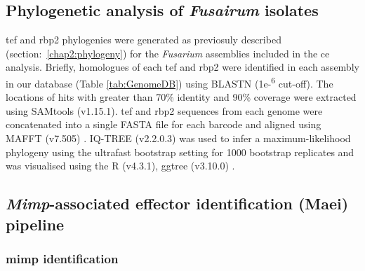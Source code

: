 \bigskip

\bigskip

\newpage

\subsection{Phylogenetic analysis of \textit{Fusairum} isolates}

\Ac{tef} and \ac{rbp2} phylogenies were generated as previosuly described (section:~\ref{chap2:phylogeny}) for the \textit{Fusarium} assemblies included in the \ac{ce} analysis. Briefly, homologues of each \ac{tef} and \ac{rbp2} were identified in each assembly in our database  (Table \ref{tab:GenomeDB}) using BLASTN (1e-\textsuperscript{6} cut-off). The locations of hits with greater than 70\% identity and 90\% coverage were extracted using SAMtools (v1.15.1). \Ac{tef} and \ac{rbp2} sequences from each genome were concatenated into a single FASTA file for each barcode and aligned using MAFFT (v7.505) \parencite{Katoh2019}. IQ-TREE (v2.2.0.3) \parencite{Nguyen2015} was used to infer a maximum-likelihood phylogeny using the ultrafast bootstrap setting for 1000 bootstrap replicates and was visualised using the R \parencite{R} (v4.3.1), ggtree (v3.10.0) \parencite{ggtree}.





\subsection{\textit{Mimp}-associated effector identification (Maei) pipeline}

\subsubsection{\Ac{mimp} identification}

